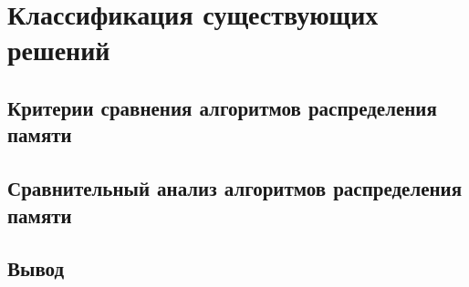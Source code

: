 \chapter{Классификация существующих решений}

\section{Критерии сравнения алгоритмов распределения памяти}
%
%
%
%
%
%
%
%
%
%
%



\section{Сравнительный анализ алгоритмов распределения памяти}



\section{Вывод}
